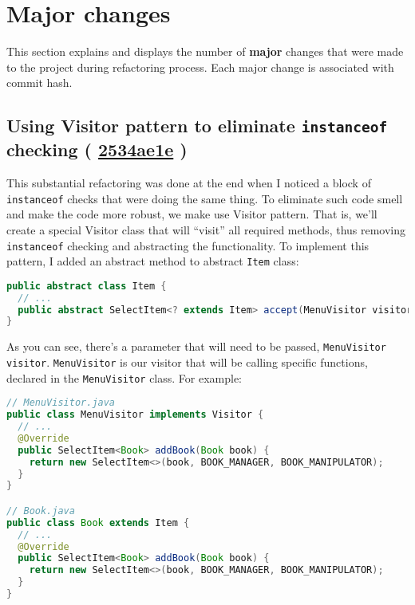 \documentclass{article}
\renewcommand{\b}[1]{\textbf{#1}}
\newcommand{\code}[1]{\texttt{#1}}
\newcommand{\gh}[1]{%
  \href{https://github.com/awave1/assessment-loan-system/commit/#1}{#1}%
}
\begin{document}
\newpage

\section*{Major changes}

This section explains and displays the number of \b{major} changes that were made to the project during refactoring process. Each major change is associated with commit hash.

\subsection*{Using Visitor pattern to eliminate \code{instanceof} checking (\gh{2534ae1e})}
This substantial refactoring was done at the end when I noticed a block of \code{instanceof} checks that were doing the same thing. To eliminate such code smell and make the code more robust, we make use Visitor pattern. That is, we'll create a special Visitor class that will ``visit'' all required methods, thus removing \code{instanceof} checking and abstracting the functionality. To implement this pattern, I added an abstract method to abstract \code{Item} class:

\begin{lstlisting}[language=Java]
public abstract class Item {
  // ...
  public abstract SelectItem<? extends Item> accept(MenuVisitor visitor);
}
\end{lstlisting}

\noindent As you can see, there's a parameter that will need to be passed, \code{MenuVisitor visitor}. \code{MenuVisitor} is our visitor that will be calling specific functions, declared in the \code{MenuVisitor} class. For example:

\begin{lstlisting}[language=Java]
// MenuVisitor.java
public class MenuVisitor implements Visitor {
  // ...
  @Override
  public SelectItem<Book> addBook(Book book) {
    return new SelectItem<>(book, BOOK_MANAGER, BOOK_MANIPULATOR);
  }
}

// Book.java
public class Book extends Item {
  // ...
  @Override
  public SelectItem<Book> addBook(Book book) {
    return new SelectItem<>(book, BOOK_MANAGER, BOOK_MANIPULATOR);
  }
}
\end{lstlisting}
\end{document}
